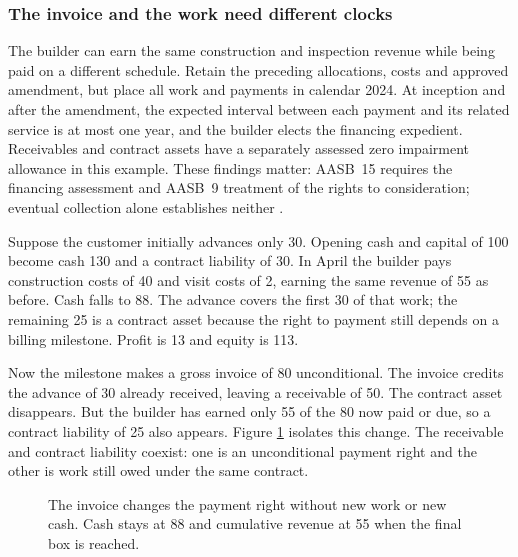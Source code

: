 \subsubsection{The invoice and the work need different clocks}
\label{sec:mixed-contract-billing}

The builder can earn the same construction and inspection revenue while being
paid on a different schedule. Retain the preceding allocations, costs and
approved amendment, but place all work and payments in calendar 2024. At
inception and after the amendment, the expected interval between each payment
and its related service is at most one year, and the builder elects the
financing expedient. Receivables and contract assets have a separately assessed
zero impairment allowance in this example. These findings matter: AASB~15
requires the financing assessment and AASB~9 treatment of the rights to
consideration; eventual collection alone establishes neither
\citep[paras.~63,105--109]{aasb15dated}.

Suppose the customer initially advances only 30. Opening cash and capital of
100 become cash 130 and a contract liability of 30. In April the builder pays
construction costs of 40 and visit costs of 2, earning the same revenue of
55 as before. Cash falls to 88. The advance covers the first 30 of that work;
the remaining 25 is a contract asset because the right to payment still
depends on a billing milestone. Profit is 13 and equity is 113.

Now the milestone makes a gross invoice of 80 unconditional. The invoice
credits the advance of 30 already received, leaving a receivable of 50. The
contract asset disappears. But the builder has earned only 55 of the 80 now
paid or due, so a contract liability of 25 also appears. Figure
\ref{fig:mixed-billing-clocks} isolates this change. The receivable and contract
liability coexist: one is an unconditional payment right and the other is
work still owed under the same contract.

\begin{figure}[htbp]
\centering
{}
\caption{The invoice changes the payment right without new work or new cash.
Cash stays at 88 and cumulative revenue at 55 when the final box is reached.}
\label{fig:mixed-billing-clocks}
\end{figure}

